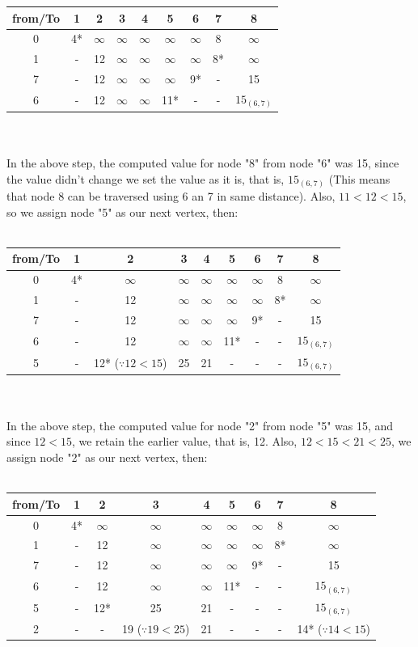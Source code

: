 \begin{tabular}{c | c| c| c| c| c| c| c| c}
	from/To & 1 & 2 & 3 & 4 & 5 & 6 & 7 & 8 \\
	\hline
	0 & 4* & $\infty$ & $\infty$& $\infty$& $\infty$& $\infty$ & 8 & $\infty$\\
	1 & - & 12 & $\infty$& $\infty$& $\infty$& $\infty$ & 8* & $\infty$\\
	7 & - & 12 & $\infty$& $\infty$& $\infty$& 9* & - & 15\\
	6 & - & 12 & $\infty$& $\infty$& 11* & - & - & $ 15_{(6, 7)}$ \\
\end{tabular}\\\\
In the above step, the computed value for node "8" from node "6" was 15, since the value didn't change we set the value as it is, that is, $ 15_{(6, 7)}$ (This means that node 8 can be traversed using 6 an 7 in same distance). Also, $ 11 < 12 < 15 $, so we assign node "5" as our next vertex, then:\\\\
\begin{tabular}{c | c| c| c| c| c| c| c| c}
	from/To & 1 & 2 & 3 & 4 & 5 & 6 & 7 & 8 \\
	\hline
	0 & 4* & $\infty$ & $\infty$& $\infty$& $\infty$& $\infty$ & 8 & $\infty$\\
	1 & - & 12 & $\infty$& $\infty$& $\infty$& $\infty$ & 8* & $\infty$\\
	7 & - & 12 & $\infty$& $\infty$& $\infty$& 9* & - & 15\\
	6 & - & 12 & $\infty$& $\infty$& 11* & - & - & $ 15_{(6, 7)}$ \\
	5 & - & 12* ($\because 12 < 15$) & 25 & 21 & - & - & - & $ 15_{(6, 7)}$ \\
\end{tabular}\\\\
In the above step, the computed value for node "2" from node "5" was 15, and since $ 12 < 15 $, we retain the earlier value, that is, 12. Also, $ 12 < 15 < 21 < 25 $, we assign node "2" as our next vertex, then:\\\\
\begin{tabular}{c | c| c| c| c| c| c| c| c}
	from/To & 1 & 2 & 3 & 4 & 5 & 6 & 7 & 8 \\
	\hline
	0 & 4* & $\infty$ & $\infty$& $\infty$& $\infty$& $\infty$ & 8 & $\infty$\\
	1 & - & 12 & $\infty$& $\infty$& $\infty$& $\infty$ & 8* & $\infty$\\
	7 & - & 12 & $\infty$& $\infty$& $\infty$& 9* & - & 15\\
	6 & - & 12 & $\infty$& $\infty$& 11* & - & - & $ 15_{(6, 7)}$ \\
	5 & - & 12* & 25 & 21 & - & - & - & $ 15_{(6, 7)}$ \\
	2 & - & - & 19 ($\because 19 < 25$)& 21 & - & - & - & 14* ($\because 14 < 15$)\\
\end{tabular}\\\\
